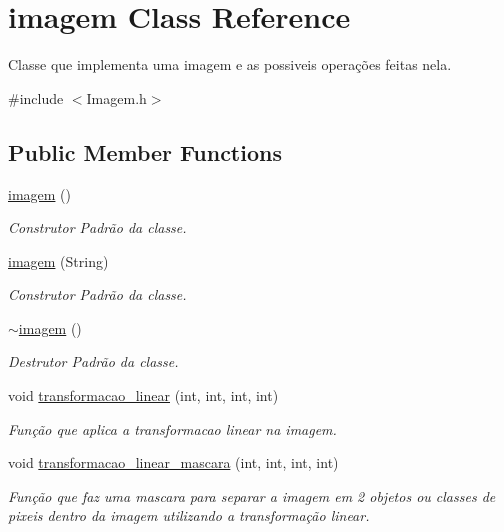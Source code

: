 \hypertarget{classimagem}{}\section{imagem Class Reference}
\label{classimagem}


Classe que implementa uma imagem e as possiveis operações feitas nela.  




{\ttfamily \#include $<$Imagem.\+h$>$}

\subsection*{Public Member Functions}
\begin{DoxyCompactItemize}
\item 
\mbox{\hyperlink{classimagem_a8b9254383530c94a0cf7528eff9a4485}{imagem}} ()
\begin{DoxyCompactList}\small\item\em Construtor Padrão da classe. \end{DoxyCompactList}\item 
\mbox{\hyperlink{classimagem_a924786f40b91371f6b401e41eb98d924}{imagem}} (String)
\begin{DoxyCompactList}\small\item\em Construtor Padrão da classe. \end{DoxyCompactList}\item 
\mbox{\hyperlink{classimagem_adefef7f11bc59fe5ab28ce3d19fb1823}{$\sim$imagem}} ()
\begin{DoxyCompactList}\small\item\em Destrutor Padrão da classe. \end{DoxyCompactList}\item 
void \mbox{\hyperlink{classimagem_a89544423c69c48cbe7320dd59a807aeb}{transformacao\+\_\+linear}} (int, int, int, int)
\begin{DoxyCompactList}\small\item\em Função que aplica a transformacao linear na imagem. \end{DoxyCompactList}\item 
void \mbox{\hyperlink{classimagem_af5316f59a80bdc2a69d933af2b1f6451}{transformacao\+\_\+linear\+\_\+mascara}} (int, int, int, int)
\begin{DoxyCompactList}\small\item\em Função que faz uma mascara para separar a imagem em 2 objetos ou classes de pixeis dentro da imagem utilizando a transformação linear. \end{DoxyCompactList}\item 

\end{DoxyCompactItemize}
